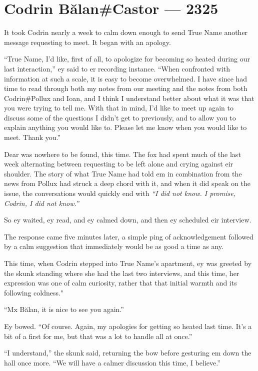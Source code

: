 \hypertarget{codrin-bux103lancastor-2325}{%
\chapter{Codrin Bălan\#Castor — 2325}\label{codrin-bux103lancastor-2325}}

It took Codrin nearly a week to calm down enough to send True Name another message requesting to meet. It began with an apology.

``True Name, I'd like, first of all, to apologize for becoming so heated during our last interaction,'' ey said to er recording instance. ``When confronted with information at such a scale, it is easy to become overwhelmed. I have since had time to read through both my notes from our meeting and the notes from both Codrin\#Pollux and Ioan, and I think I understand better about what it was that you were trying to tell me. With that in mind, I'd like to meet up again to discuss some of the questions I didn't get to previously, and to allow you to explain anything you would like to. Please let me know when you would like to meet. Thank you.''

Dear was nowhere to be found, this time. The fox had spent much of the last week alternating between requesting to be left alone and crying against eir shoulder. The story of what True Name had told em in combination from the news from Pollux had struck a deep chord with it, and when it did speak on the issue, the conversations would quickly end with \emph{``I did not know. I promise, Codrin, I did not know.''}

So ey waited, ey read, and ey calmed down, and then ey scheduled eir interview.

The response came five minutes later, a simple ping of acknowledgement followed by a calm suggestion that immediately would be as good a time as any.

This time, when Codrin stepped into True Name's apartment, ey was greeted by the skunk standing where she had the last two interviews, and this time, her expression was one of calm curiosity, rather that that initial warmth and its following coldness."

``Mx Bălan, it is nice to see you again.''

Ey bowed. ``Of course. Again, my apologies for getting so heated last time. It's a bit of a first for me, but that was a lot to handle all at once.''

``I understand,'' the skunk said, returning the bow before gesturing em down the hall once more. ``We will have a calmer discussion this time, I believe.''

